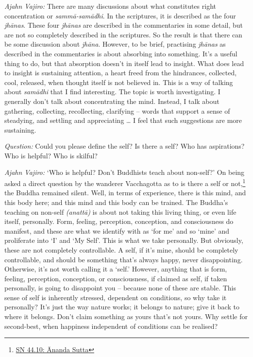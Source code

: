 \emph{Ajahn Vajiro:} There are many discussions about what constitutes right
concentration or \emph{sammā-samādhi}. In the scriptures, it is described as the
four \emph{jhānas}. These four \emph{jhānas} are described in the commentaries
in some detail, but are not so completely described in the scriptures. So the
result is that there can be some discussion about \emph{jhāna}. However, to be
brief, practising \emph{jhānas} as described in the commentaries is about
absorbing into something. It's a useful thing to do, but that absorption doesn't
in itself lead to insight. What does lead to insight is sustaining attention, a
heart freed from the hindrances, collected, cool, released, when thought itself
is not believed in. This is a way of talking about \emph{samādhi} that I find
interesting. The topic is worth investigating. I generally don't talk about
concentrating the mind. Instead, I talk about gathering, collecting,
recollecting, clarifying -- words that support a sense of steadying, and
settling and appreciating \ldots{} I feel that such suggestions are more
sustaining.

\bigskip

\emph{Question:} Could you please define the self? Is there a self? Who has
aspirations? Who is helpful? Who is skilful?

\emph{Ajahn Vajiro:} `Who is helpful? Don't Buddhists teach about non-self?' On being
asked a direct question by the wanderer Vacchagotta as to is there a self or not,\footnote{\href{https://suttacentral.net/sn44.10/en/bodhi}{SN 44.10: Ānanda Sutta}} the Buddha remained silent. Well, in terms of experience,
there is this mind, and this body here; and this mind and this body can be
trained. The Buddha's teaching on non-self \emph{(anattā)} is about not taking
this living thing, or even life itself, personally. Form, feeling, perception,
conception, and consciousness do manifest, and these are what we identify with
as `for me' and so `mine' and proliferate into `I' and `My Self'. This is what we take personally. But obviously, these
are not completely controllable. A self, if it's mine, should be completely
controllable, and should be something that's always happy, never disappointing.
Otherwise, it's not worth calling it a `self.' However, anything that is form,
feeling, perception, conception, or consciousness, if claimed as self, if taken
personally, is going to disappoint you -- because none of these are stable.
This sense of self is inherently stressed, dependent on conditions, so why take it personally? It's just the way nature works; it belongs to nature; give it back
to where it belongs. Don't claim something as yours that's not yours. Why settle
for second-best, when happiness independent of conditions can be realised?

